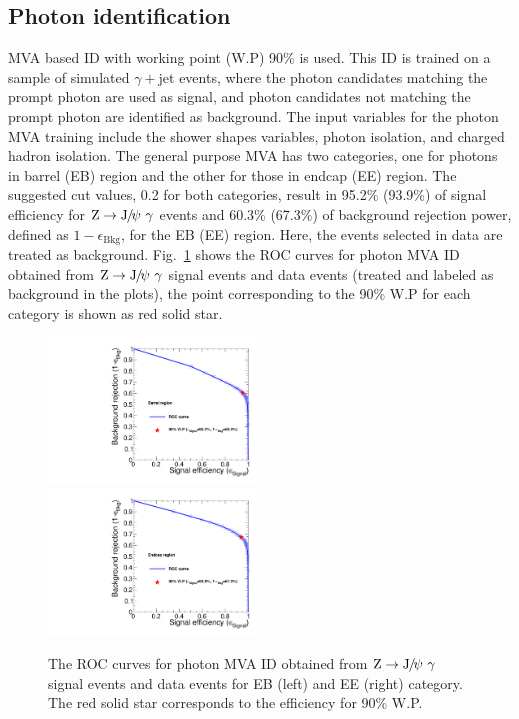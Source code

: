 		\subsection{Photon identification}
		\label{sec:pho}
		MVA based ID with working point (W.P) 90\% is used. 
		This ID is trained on a sample of simulated $\gamma+\text{jet}$ events, where the photon candidates matching the prompt photon are used as signal, and photon candidates not matching the prompt photon are identified as background.
		The input variables for the photon MVA training include the shower shapes variables, photon isolation, and charged hadron isolation. 
		The general purpose MVA has two categories, one for photons in barrel (EB) region and the other for those in endcap (EE) region. The suggested cut values, 0.2 for both categories, result in 95.2\% (93.9\%) of signal efficiency for $\mathrm{Z}\to{\mathrm{J}\hspace{-.08em}/\hspace{-.14em}\psi}\ \gamma$ events and 60.3\% (67.3\%) of background rejection power, defined as $1-\epsilon_{\text{Bkg}}$, for the EB (EE) region. Here, the events selected in data are treated as background. 
		Fig.~\ref{fig:PhoMVAROC} shows the ROC curves for photon MVA ID obtained from $\mathrm{Z}\to{\mathrm{J}\hspace{-.08em}/\hspace{-.14em}\psi}\ \gamma$ signal events and data events (treated and labeled as background in the plots), the point corresponding to the 90\% W.P for each category is shown as red solid star.
		
		\begin{figure}[!ht]
		  \centering
		  \includegraphics[width=0.49\textwidth]{Fig/PhoMVAIDSF/ROCcurve_phoMVA_ZJpsiG_EB}~
		  \includegraphics[width=0.49\textwidth]{Fig/PhoMVAIDSF/ROCcurve_phoMVA_ZJpsiG_EE}\\
		  \caption{The ROC curves for photon MVA ID obtained from $\mathrm{Z}\to{\mathrm{J}\hspace{-.08em}/\hspace{-.14em}\psi}\ \gamma$ signal events and data events for EB (left) and EE (right) category. The red solid star corresponds to the efficiency for 90\% W.P. \label{fig:PhoMVAROC}}
		\end{figure}	
		
